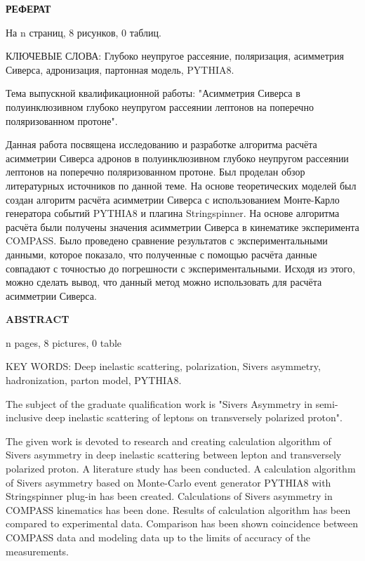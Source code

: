 \newpage


\thispagestyle{empty}
\begin{center}
	\textbf{\MakeUppercase{Реферат}}
\end{center}
\begin{center}
	На n страниц, 8 рисунков, 0 таблиц.
\end{center}

КЛЮЧЕВЫЕ СЛОВА: Глубоко неупругое рассеяние, поляризация, асимметрия Сиверса, адронизация, партонная модель, PYTHIA8.

Тема выпускной квалификационной работы: "Асимметрия Сиверса в полуинклюзивном глубоко неупругом рассеянии лептонов на поперечно поляризованном протоне".

Данная работа посвящена исследованию и разработке алгоритма расчёта асимметрии Сиверса адронов в полуинклюзивном глубоко неупругом рассеянии лептонов на поперечно поляризованном протоне. Был проделан обзор литературных источников по данной теме. На основе теоретических моделей был создан алгоритм расчёта асимметрии Сиверса с использованием Монте-Карло генератора событий PYTHIA8 и плагина Stringspinner. На основе алгоритма расчёта были получены значения асимметрии Сиверса в кинематике эксперимента COMPASS. Было проведено сравнение результатов с экспериментальными данными, которое показало, что полученные с помощью расчёта данные совпадают с точностью до погрешности с экспериментальными. Исходя из этого, можно сделать вывод, что данный метод можно использовать для расчёта асимметрии Сиверса.
\thispagestyle{empty}


\begin{center}
	\textbf{\MakeUppercase{Abstract}}
\end{center}
\begin{center}
	n pages, 8 pictures, 0 table
\end{center} 

KEY WORDS: Deep inelastic scattering, polarization, Sivers asymmetry, hadronization, parton model, PYTHIA8.

The subject of the graduate qualification work is "Sivers Asymmetry in semi-inclusive deep inelastic scattering of leptons on transversely polarized proton". 

The given work is devoted to research and creating calculation algorithm of Sivers asymmetry in deep inelastic scattering between lepton and transversely polarized proton. A literature study has been conducted. A calculation algorithm of Sivers asymmetry based on Monte-Carlo event generator PYTHIA8 with Stringspinner plug-in has been created. Calculations of Sivers asymmetry in COMPASS kinematics has been done. Results of calculation algorithm has been compared to experimental data. Comparison has been shown coincidence between COMPASS data and modeling data up to the limits of accuracy of the measurements.  
 
